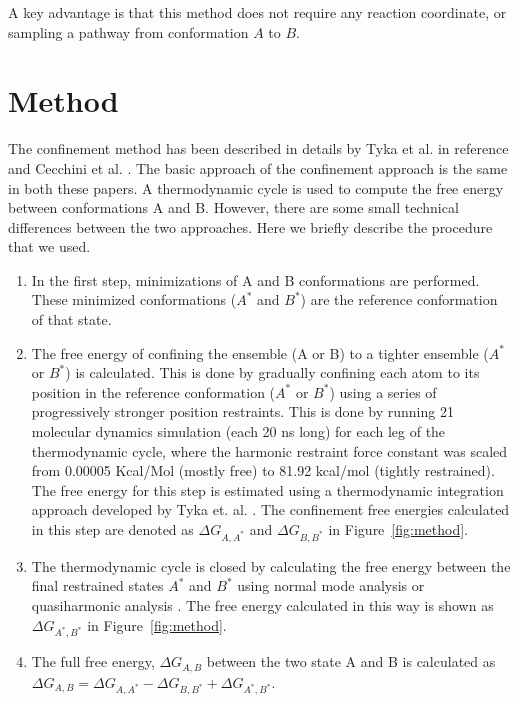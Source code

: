 \documentclass[12pt]{article}
\begin{document}
A key advantage is that this method does not require any reaction coordinate, or sampling a
pathway from conformation $A$ to $B$. 



\section{Method}

The confinement method has been described in details by Tyka et al. in reference \cite{Tyka2006} and
Cecchini et  al. \cite{Cecchini2009}. The basic approach of the confinement approach is the same in
both these papers. A thermodynamic cycle is used to compute the free energy between conformations A
and B. However, there are some small technical differences between the two approaches. Here we briefly
describe the procedure that we used.

\begin{enumerate}

\item  In the first step, minimizations of A and B conformations are performed. These minimized conformations
    ($A^{\ast}$ and $B^{\ast}$) are the reference conformation of that state.

\item The free energy of confining the ensemble (A or B) to a tighter ensemble ($A^\ast$ or $B^\ast$) is calculated.
    This is done by gradually confining each atom to its position in the reference conformation ($A^{\ast}$ or
    $B^{\ast}$) using a series of progressively stronger position restraints. This is done by running 21 molecular
    dynamics simulation (each 20 ns long) for each leg of the thermodynamic cycle, where the harmonic restraint force
    constant was scaled from 0.00005 Kcal/Mol (mostly free) to 81.92 kcal/mol (tightly restrained). The free energy for
    this step is estimated using a thermodynamic integration approach developed by Tyka et. al. \cite{Tyka2006}. The
    confinement free energies calculated in this step are denoted as $\Delta G_{A,A^\ast}$ and $\Delta G_{B,B^\ast}$ in
    Figure~\ref{fig:method}. 

\item The thermodynamic cycle is closed by calculating the free energy between the final restrained states $A^\ast$ and
    $B^\ast$ using normal mode analysis \cite{Brooks1983,Case1994} or quasiharmonic analysis \cite{Karplus1981,Levy1984}. The free energy calculated in this way is shown as
    $\Delta G_{A^\ast,B^\ast}$ in Figure~\ref{fig:method}.

\item  The full free energy, $\Delta G_{A,B}$ between the two state A and B is calculated as
    $\Delta G_{A,B} = \Delta G_{A,A^\ast} - \Delta G_{B,B^\ast} + \Delta G_{A^\ast,B^\ast}$.

\end{enumerate}
\end{document}
